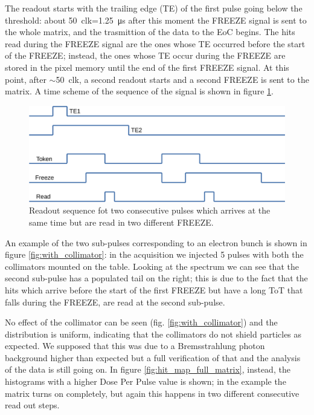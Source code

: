    The readout starts with the trailing edge (TE) of the first pulse going below the threshold: about \SI{50}{clk}=\SI{1.25}{\us} after this moment the FREEZE signal is sent to the whole matrix, and the trasmittion of the data to the EoC begins.
   The hits read during the FREEZE signal are the ones whose TE occurred before the start of the FREEZE; instead, the ones whose TE occur during the FREEZE are stored in the pixel memory until the end of the first FREEZE signal. At this point, after $\sim$\SI{50}{clk}, a second readout starts and a second FREEZE is sent to the matrix.  
   A time scheme of the sequence of the signal is shown in figure \ref{fig:time_scheme}.
   \begin{figure}
      \centering
      \includegraphics[width=0.8\linewidth]{figures/test_beam/time.pdf}
      \caption{Readout sequence fot two consecutive pulses which arrives at the same time but are read in two different FREEZE.}
      \label{fig:time_scheme}
   \end{figure}

   An example of the two sub-pulses corresponding to an electron bunch is shown in figure \ref{fig:with_collimator}: in the acquisition we injected 5 pulses with both the collimators mounted on the table. 
   Looking at the spectrum we can see that the second sub-pulse has a populated tail on the right; this is due to the fact that the hits which arrive before the start of the first FREEZE but have a long ToT that falls during the FREEZE, are read at the second sub-pulse. 
   
   No effect of the collimator can be seen (fig. \ref{fig:with_collimator}) and the distribution is uniform, indicating that the collimators do not shield particles as expected.
   We supposed that this was due to a Bremsstrahlung photon background higher than expected but a full verification of that and the analysis of the data is still going on. 
   In figure \ref{fig:hit_map_full_matrix}, instead, the histograms with a higher Dose Per Pulse value is shown; in the example the matrix turns on completely, but again this happens in two different consecutive read out steps. 

